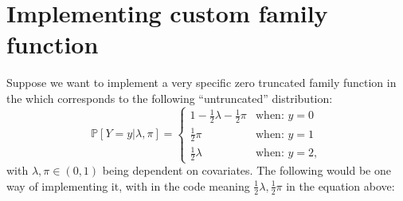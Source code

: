 \documentclass[
]{jss}
\newcommand{\1}{\mathcal{I}} \newcommand{\bZero}{\boldsymbol{0}}
\begin{document}
\section[Implementing custom singleRcapture family function]{Implementing
custom  family
function}\label{implementing-custom-family-function}

Suppose we want to implement a very specific zero truncated family
function in the  which corresponds to the following
``untruncated'' distribution: \begin{equation}
  \mathbb{P}[Y=y|\lambda, \pi] = \begin{cases}
    1 - \frac{1}{2}\lambda - \frac{1}{2}\pi & \text{when: } y=0\\
    \frac{1}{2}\pi & \text{when: } y=1\\
    \frac{1}{2}\lambda & \text{when: } y=2,
  \end{cases}
\end{equation} with \(\lambda, \pi\in\left(0, 1\right)\) being dependent
on covariates. The following would be one way of implementing it, with
 in the code meaning
\(\frac{1}{2}\lambda,\frac{1}{2}\pi\) in the equation above:

\footnotesize
\end{document}
